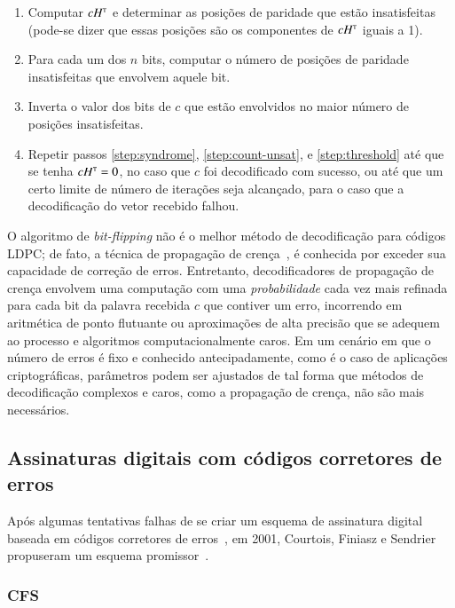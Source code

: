 \documentclass{SBCbookchapter}
\newcommand{\tp}{\textrm{\tiny T}}
\begin{document}
\begin{otherlanguage}{brazilian}
\begin{enumerate}
	\item Computar $c H^{\tp}$ e determinar as posições de paridade que estão insatisfeitas (pode-se dizer que essas posições são os componentes de $c H^{\tp}$ iguais a 1). \label{step:syndrome}
	\item Para cada um dos $n$ bits, computar o número de posições de paridade insatisfeitas que envolvem aquele bit. \label{step:count-unsat}
	\item Inverta o valor dos bits de $c$ que estão envolvidos no maior número de posições insatisfeitas. \label{step:threshold}
	\item Repetir passos \ref{step:syndrome}, \ref{step:count-unsat}, e \ref{step:threshold} até que se tenha $c H^{\tp} = 0$, no caso que $c$ foi decodificado com sucesso, ou até que um certo limite de número de iterações seja alcançado, para o caso que a decodificação do vetor recebido falhou.
\end{enumerate}

O algoritmo de \emph{bit-flipping} não é o melhor método de decodificação para códigos LDPC; de fato, a técnica de propagação de crença~\cite{gallager,huffman-pless}, é conhecida por exceder sua capacidade de correção de erros. Entretanto, decodificadores de propagação de crença envolvem uma computação com uma \emph{probabilidade} cada vez mais refinada para cada bit da palavra recebida $c$ que contiver um erro, incorrendo em aritmética de ponto flutuante ou aproximações de alta precisão que se adequem ao processo e algoritmos computacionalmente caros. Em um cenário em que o número de erros é fixo e conhecido antecipadamente, como é o caso de aplicações criptográficas, parâmetros podem ser ajustados de tal forma que métodos de decodificação complexos e caros, como a propagação de crença, não são mais necessários.

\subsection{Assinaturas digitais com códigos corretores de erros}\label{subsec:sighcode}

Após algumas tentativas falhas de se criar um esquema de assinatura digital \\baseada em códigos corretores de erros~\cite{alabbadi-wicker,stern-sign}, em 2001, Courtois, Finiasz e Sendrier propuseram um esquema promissor~\cite{courtois-finiasz-sendrier}.

\subsubsection{CFS}\label{subsubsec:cfs}


\end{otherlanguage}
\end{document}
